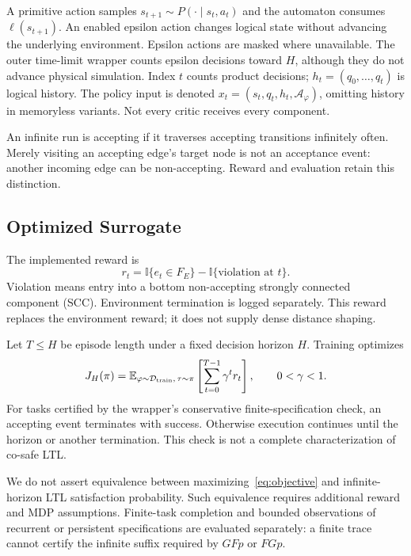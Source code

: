 \documentclass[conference]{IEEEtran}
\newcommand{\E}{\mathbb{E}}
\newcommand{\ind}{\mathbb{I}}
\begin{document}
A primitive action samples $s_{t+1}\sim P(\cdot\mid s_t,a_t)$ and the automaton consumes $\ell(s_{t+1})$. An enabled epsilon action changes logical state without advancing the underlying environment. Epsilon actions are masked where unavailable. The outer time-limit wrapper counts epsilon decisions toward $H$, although they do not advance physical simulation. Index $t$ counts product decisions; $h_t=(q_0,\ldots,q_t)$ is logical history. The policy input is denoted $x_t=(s_t,q_t,h_t,\mathcal A_\varphi)$, omitting history in memoryless variants. Not every critic receives every component.

An infinite run is accepting if it traverses accepting transitions infinitely often. Merely visiting an accepting edge's target node is not an acceptance event: another incoming edge can be non-accepting. Reward and evaluation retain this distinction.

\subsection{Optimized Surrogate}
The implemented reward is
\begin{equation}
r_t=\ind\{e_t\in F_E\}-\ind\{\text{violation at }t\}.
\label{eq:reward}
\end{equation}
Violation means entry into a bottom non-accepting strongly connected component (SCC). Environment termination is logged separately. This reward replaces the environment reward; it does not supply dense distance shaping.

Let $T\leq H$ be episode length under a fixed decision horizon $H$. Training optimizes
\begin{equation}
J_H(\pi)=\E_{\varphi\sim\mathcal D_{\rm train},\,\tau\sim\pi}
\left[\sum_{t=0}^{T-1}\gamma^t r_t\right],\qquad0<\gamma<1.
\label{eq:objective}
\end{equation}
For tasks certified by the wrapper's conservative finite-specification check, an accepting event terminates with success. Otherwise execution continues until the horizon or another termination. This check is not a complete characterization of co-safe LTL.

We do not assert equivalence between maximizing~\eqref{eq:objective} and infinite-horizon LTL satisfaction probability. Such equivalence requires additional reward and MDP assumptions. Finite-task completion and bounded observations of recurrent or persistent specifications are evaluated separately: a finite trace cannot certify the infinite suffix required by $GFp$ or $FGp$.
\end{document}
